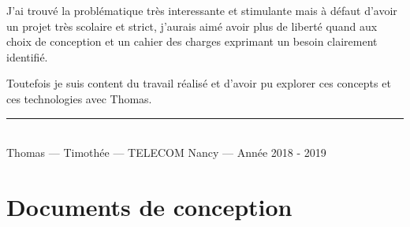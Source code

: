 \documentclass[a4paper, 11pt, twoside]{book}
\renewcommand{\tn}{TELECOM Nancy}
\begin{document}
J'ai trouvé la problématique très interessante et stimulante mais à défaut d'avoir un projet très scolaire et strict, j'aurais aimé avoir plus de liberté quand aux choix de conception et un cahier des charges exprimant un besoin clairement identifié.

Toutefois je suis content du travail réalisé et d'avoir pu explorer ces concepts et ces technologies avec Thomas.





\vfill

\begin{center}
\rule{0.9\linewidth}{1pt}\\
{\small
  Thomas  --- Timothée  --- \tn{} --- Année 2018 - 2019
}
\end{center}

\appendix{}
\chapter{Documents de conception}



\end{document}
